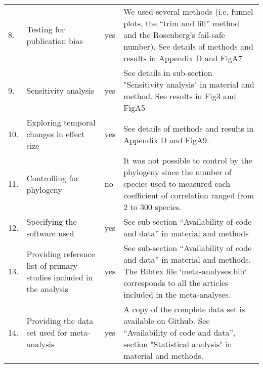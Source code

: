 \documentclass[a4paper,11pt]{article}
\begin{document}
\begin{table}[h!]
{\begin{tabular}{p{0.2cm}p{5cm}p{0.8cm}p{9cm}}
  8.& Testing for publication bias &	yes	& We used several methods (i.e. funnel plots, the ``trim and fill'' method and the Rosenberg’s fail-safe number). See details of methods and results in Appendix D and FigA7\\
  9.& Sensitivity analysis &	yes &	See details in sub-section "Sensitivity analysis" in material and method. See results in Fig3 and FigA5 \\
  10.& Exploring temporal changes in effect size &	yes	& See details of methods and results in Appendix D and FigA9.\\
  11.& Controlling for phylogeny &	no &	It was not possible to control by the phylogeny since the number of species used to measured each coefficient of correlation ranged from 2 to 300 species.\\
  12.& Specifying the software used &	yes	& See sub-section ``Availability of code and data'' in material and methods\\
 13.& Providing reference list of primary studies included in the analysis &	yes &	See sub-section ``Availability of code and data'' in material and methods. The Bibtex file `meta-analyses.bib` corresponds to all the articles included in the meta-analyses. \\
  14.& Providing the data set used for meta-analysis  &	yes &	A copy of the complete data set is available on Github. See ``Availability of code and data'', section "Statistical analysis" in material and methods. \\
   \hline
\end{tabular}
}
\label{tab:meta}
\end{table}
\end{document}
